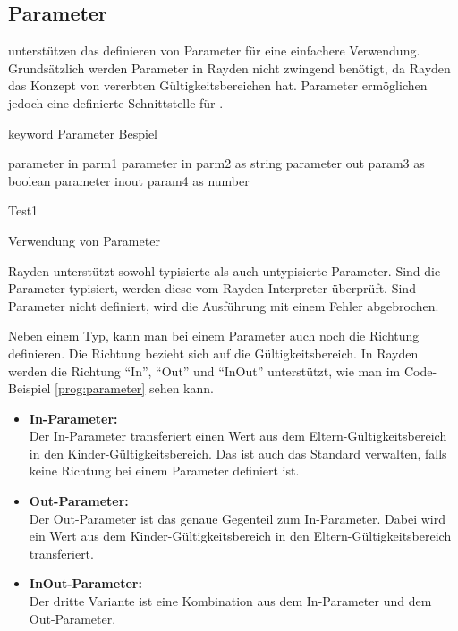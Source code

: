 
\subsection{Parameter}
\label{cha:Parameter}

 unterstützen das definieren von Parameter für eine einfachere Verwendung. Grundsätzlich werden Parameter in Rayden nicht zwingend benötigt, da Rayden das Konzept von vererbten Gültigkeitsbereichen hat. Parameter ermöglichen jedoch eine definierte Schnittstelle für . 

\begin{program}
\begin{JavaCode}
keyword Parameter Bespiel {
	
	parameter in    parm1
	parameter in    parm2 as string
	parameter out   param3 as boolean
	parameter inout param4 as number
	
	Test1	
}
\end{JavaCode}
\caption{Verwendung von Parameter}
\label{prog:parameter}
\end{program}


\SuperPar
Rayden unterstützt sowohl typisierte als auch untypisierte Parameter. Sind die Parameter typisiert, werden diese vom Rayden-Interpreter überprüft. Sind Parameter nicht definiert, wird die Ausführung mit einem Fehler abgebrochen. 

\SuperPar
Neben einem Typ, kann man bei einem Parameter auch noch die Richtung definieren. Die Richtung bezieht sich auf die Gültigkeitsbereich. In Rayden werden die Richtung "`In"', "`Out"' und "`InOut"' unterstützt, wie man im Code-Beispiel \ref{prog:parameter} sehen kann. 

\begin{itemize}
\item \textbf{In-Parameter:}\\
Der In-Parameter transferiert einen Wert aus dem Eltern-Gültigkeitsbereich in den Kinder-Gültigkeitsbereich. Das ist auch das Standard verwalten, falls keine Richtung bei einem Parameter definiert ist.\\

\item \textbf{Out-Parameter:}\\
Der Out-Parameter ist das genaue Gegenteil zum In-Parameter. Dabei wird ein Wert aus dem Kinder-Gültigkeitsbereich in den Eltern-Gültigkeitsbereich transferiert. \\

\item \textbf{InOut-Parameter:}\\
Der dritte Variante ist eine Kombination aus dem In-Parameter und dem Out-Parameter.\\
\end{itemize}

